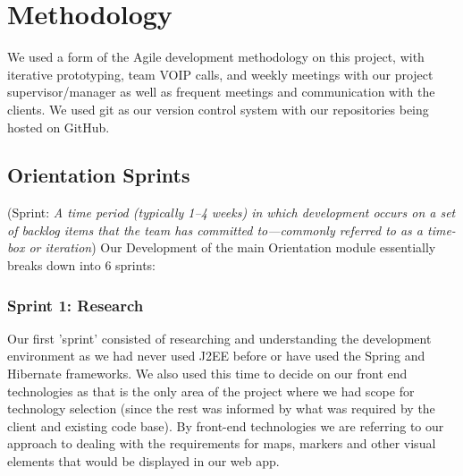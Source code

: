 \chapter{Methodology}
We used a form of the Agile development methodology on this project, with iterative prototyping, team VOIP calls, and weekly meetings with our project supervisor/manager as well as frequent meetings and communication with the clients. We used git as our version control system with our repositories being hosted on GitHub.

\section{Orientation Sprints}
(Sprint: \emph{A time period (typically 1–4 weeks) in which development occurs on a set of backlog items that the team has committed to—commonly referred to as a time-box or iteration}) 
Our Development of the main Orientation module essentially breaks down into 6 sprints:

\subsection{Sprint  1: Research}
Our first 'sprint' consisted of researching and understanding the development environment as we had never used J2EE before or have used the Spring and Hibernate frameworks. We also used this time to decide on our front end technologies as that is the only area of the project where we had scope for technology selection (since the rest was informed by what was required by the client and existing code base). By front-end technologies we are referring to our approach to dealing with the requirements for maps, markers and other visual elements that would be displayed in our web app.\newline


